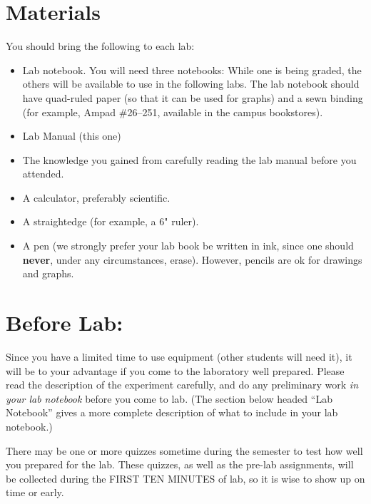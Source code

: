 \section*{Materials}
You should bring the following to each lab:
\begin{itemize}
\item Lab notebook.  You will need three notebooks: While one is being
graded, the others will be available to use in the following labs.  The lab
notebook should have quad-ruled paper (so that it can be used for
graphs) and a sewn binding (for example, Ampad \#26--251, available in
the campus bookstores).
%
  \item Lab Manual (this one)
%
  \item The knowledge you gained from carefully reading the lab manual
  before you attended.
  \item A calculator, preferably scientific.
  \item A straightedge (for example, a 6" ruler).
\item A pen (we strongly prefer your lab book be written in
ink, since one should {\bf never}, under any circumstances, erase).
However, pencils are ok for drawings and graphs.
\end{itemize}

\section*{Before Lab:}

     Since you have a limited time to use equipment (other
students will need it), it will be to your advantage
if you come to the laboratory well prepared.  Please read the
description of the experiment carefully, and do any preliminary work
{\em in your lab notebook} before you come to lab.   (The section below
headed ``Lab Notebook'' gives a more complete description of what to
include in your lab notebook.)

There may be one or more quizzes
sometime during the semester to test how well you prepared for the lab.
These quizzes, as well as the pre-lab assignments, will be collected during
the FIRST TEN MINUTES of lab, so it is wise to show up on time or early.

